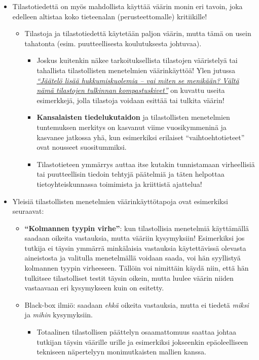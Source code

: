 \documentclass[
]{book}
\providecommand{\tightlist}{%
  \setlength{\itemsep}{0pt}\setlength{\parskip}{0pt}}
\begin{document}
\begin{itemize}
\tightlist
\item
  Tilastotiedettä on myös mahdollista käyttää väärin monin eri tavoin, joka edelleen altistaa koko tieteenalan (perusteettomalle) kritiikille!

  \begin{itemize}
  \tightlist
  \item
    Tilastoja ja tilastotiedettä käytetään paljon väärin, mutta tämä on usein tahatonta (esim. puutteellisesta koulutuksesta johtuvaa).

    \begin{itemize}
    \tightlist
    \item
      Joskus kuitenkin näkee tarkoituksellista tilastojen vääristelyä tai tahallista tilastollisten menetelmien väärinkäyttöä! Ylen jutussa \href{https://yle.fi/aihe/artikkeli/2021/03/27/jaatelo-lisaa-hukkumiskuolemia-vai-miten-se-menikaan-valta-nama-tilastojen}{\emph{``Jäätelö lisää hukkumiskuolemia -- vai miten se menikään? Vältä nämä tilastojen tulkinnan kompastuskivet''}} on kuvattu useita esimerkkejä, jolla tilastoja voidaan esittää tai tulkita väärin!
    \item
      \textbf{Kansalaisten tiedelukutaidon} ja tilastollisten menetelmien tuntemuksen merkitys on kasvanut viime vuosikymmeninä ja kasvanee jatkossa yhä, kun esimerkiksi erilaiset ``vaihtoehtotieteet'' ovat nousseet suositummiksi.
    \item
      Tilastotieteen ymmärrys auttaa itse kutakin tunnistamaan virheellisiä tai puutteellisin tiedoin tehtyjä päätelmiä ja täten helpottaa tietoyhteiskunnassa toimimista ja kriittistä ajattelua!
    \end{itemize}
  \end{itemize}
\item
  Yleisiä tilastollisten menetelmien väärinkäyttötapoja ovat esimerkiksi seuraavat:

  \begin{itemize}
  \tightlist
  \item
    \textbf{``Kolmannen tyypin virhe''}: kun tilastollisia menetelmiä käyttämällä saadaan oikeita vastauksia, mutta vääriin kysymyksiin! Esimerkiksi jos tutkija ei täysin ymmärrä minkälaisia vastauksia käytettävissä olevasta aineistosta ja valitulla menetelmällä voidaan saada, voi hän syyllistyä kolmannen tyypin virheeseen. Tällöin voi nimittäin käydä niin, että hän tulkitsee tilastolliset testit täysin oikein, mutta luulee väärin niiden vastaavaan eri kysymykseen kuin on esitetty.
  \item
    Black-box ilmiö: saadaan \emph{ehkä} oikeita vastauksia, mutta ei tiedetä \emph{miksi} ja \emph{mihin} kysymyksiin.

    \begin{itemize}
    \tightlist
    \item
      Totaalinen tilastollisen päättelyn osaamattomuus saattaa johtaa tutkijan täysin väärille urille ja esimerkiksi jokseenkin epäoleelliseen tekniseen näpertelyyn monimutkaisten mallien kanssa.
    \end{itemize}
  \end{itemize}
\end{itemize}
\end{document}
